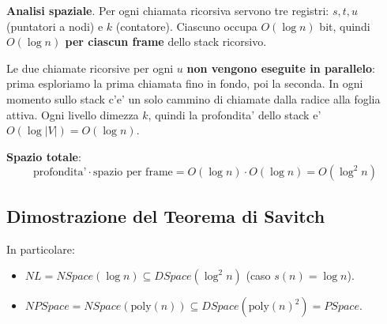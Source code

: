 {  \textbf{Analisi spaziale}. Per ogni chiamata ricorsiva servono tre registri: $s, t, u$ (puntatori a nodi) e $k$ (contatore). Ciascuno occupa $O(\log n)$ bit, quindi \textbf{$O(\log n)$ per ciascun frame} dello stack ricorsivo.

  Le due chiamate ricorsive per ogni $u$ \textbf{non vengono eseguite in parallelo}: prima esploriamo la prima chiamata fino in fondo, poi la seconda. In ogni momento sullo stack c'e' un solo cammino di chiamate dalla radice alla foglia attiva. Ogni livello dimezza $k$, quindi la profondita' dello stack e' $O(\log |V|) = O(\log n)$.

  \textbf{Spazio totale}:
  \[
    \text{profondita'} \cdot \text{spazio per frame} = O(\log n) \cdot O(\log n) = O(\log^2 n)
  \]
}

\subsection{Dimostrazione del Teorema di Savitch}


In particolare:
\begin{itemize}
  \item $NL = NSpace(\log n) \subseteq DSpace(\log^2 n)$ (caso $s(n) = \log n$).
  \item $NPSpace = NSpace(\text{poly}(n)) \subseteq DSpace(\text{poly}(n)^2) = PSpace$.
\end{itemize}

